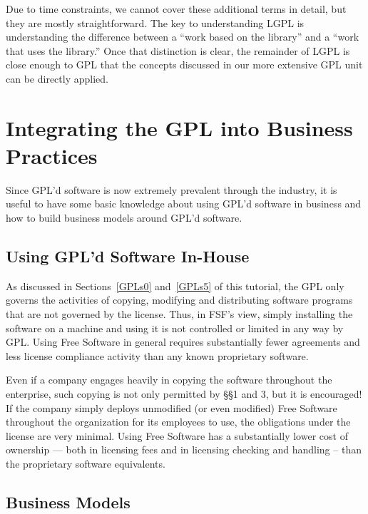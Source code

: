 Due to time constraints, we cannot cover these additional terms in detail,
but they are mostly straightforward. The key to understanding LGPL is
understanding the difference between a ``work based on the library'' and a
``work that uses the library.''  Once that distinction is clear, the
remainder of LGPL is close enough to GPL that the concepts discussed in
our more extensive GPL unit can be directly applied.

\chapter{Integrating the GPL into Business Practices}

Since GPL'd software is now extremely prevalent through the industry, it
is useful to have some basic knowledge about using GPL'd software in
business and how to build business models around GPL'd software.

\section{Using GPL'd Software In-House}

As discussed in Sections~\ref{GPLs0} and~\ref{GPLs5} of this tutorial,
the GPL only governs the activities of copying, modifying and
distributing software programs that are not governed by the license.
Thus, in FSF's view, simply installing the software on a machine and
using it is not controlled or limited in any way by GPL\@. Using Free
Software in general requires substantially fewer agreements and less
license compliance activity than any known proprietary software.

Even if a company engages heavily in copying the software throughout the
enterprise, such copying is not only permitted by \S\S 1 and 3, but it is
encouraged!  If the company simply deploys unmodified (or even modified)
Free Software throughout the organization for its employees to use, the
obligations under the license are very minimal. Using Free Software has a
substantially lower cost of ownership --- both in licensing fees and in
licensing checking and handling -- than the proprietary software
equivalents.

\section{Business Models}
\label{Business Models}

